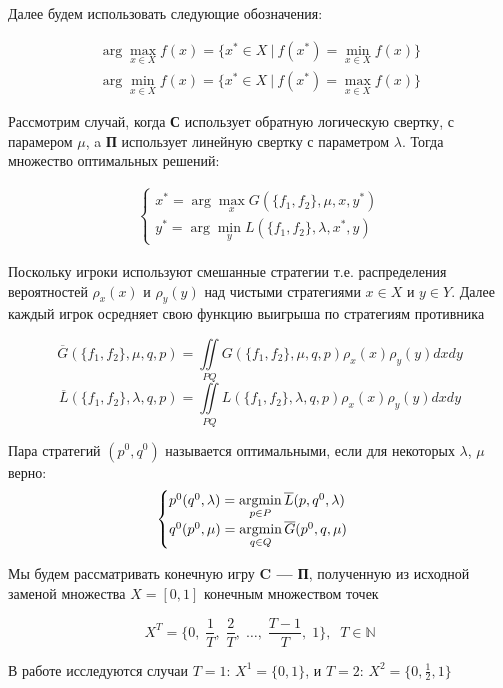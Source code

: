 Далее будем использовать следующие обозначения:

\begin{gather*}
	\arg \max \limits_{x \in X} f(x) = 
	\{ x^* \in X \: | \: f(x^*) = \min \limits_{x \in X} f(x)\}
	\\
	\arg \min \limits_{x \in X} f(x) = 
	\{ x^* \in X \: | \: f(x^*) = \max \limits_{x \in X} f(x)\}
\end{gather*}

Рассмотрим случай, когда \textbf{С} использует обратную логическую свертку,
с парамером $\mu$, a \textbf{П} использует линейную
свертку с параметром $\lambda$. Тогда множество оптимальных решений:

\begin{gather*}
	\begin{cases}
		x^*=\arg \max \limits_{x}   G(\{f_1, f_2\}, \mu, x, y^*) \\
		y^*=\arg \min \limits_{y}   L(\{f_1, f_2\}, \lambda, x^*, y)
	\end{cases}
\end{gather*}

Поскольку игроки используют смешанные стратегии т.е. распределения вероятностей
$\rho_x(x)$ и $\rho_y(y)$ над чистыми стратегиями $x \in X$ и $y \in Y$. 
Далее каждый игрок осредняет свою функцию выигрыша по стратегиям противника

$$ \overline G(\{f_1, f_2\}, \mu, q, p) = 
\iint \limits_{PQ} G(\{f_1, f_2\}, \mu, q, p) \rho_x(x) \rho_y(y)dxdy$$
$$ \overline L(\{f_1, f_2\}, \lambda, q, p) = 
\iint \limits_{PQ} L(\{f_1, f_2\}, \lambda, q, p) \rho_x(x) \rho_y(y)dxdy$$

\begin{Def}	\label{def:optimal_strategy}
	Пара стратегий $(p^0, q^0)$ называется оптимальными, если для некоторых 
	$\lambda$, $\mu$ верно:
	\begin{equation}
		\begin{cases} 
		p^0(q^0, \lambda) = \operatorname*{argmin}\limits_{p \in P} \overline L(p, q^0, \lambda) \\ 
		q^0(p^0, \mu) = \operatorname*{argmin}\limits_{q \in Q} \overline G(p^0, q, \mu) \\
	\end{cases}
	\end{equation}
\end{Def}

Мы будем рассматривать конечную игру \textbf{C --- П}, полученную из исходной 
заменой множества $X=[0,1]$ конечным множеством точек

$$X^T = \{
	0, \; \frac{1}{T}, \; \frac{2}{T}, \; \ldots, \; \frac{T-1}{T}, \; 1
\}, \;\; T \in \mathbb{N}$$

В работе исследуются случаи $T=1$: $X^1=\{0, 1\}$, 
и $T=2$: $X^2=\{0, \frac{1}{2} ,1\}$